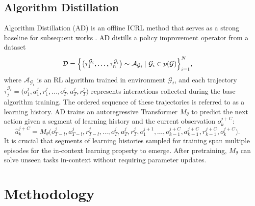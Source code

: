 \documentclass{article}
\begin{document}
\subsection{Algorithm Distillation}
Algorithm Distillation (AD) \citep{laskin2022context} is an offline ICRL method that serves as a strong baseline for subsequent works \citep{lee2024supervised, elawady2024relic}. AD distills a policy improvement operator from a dataset
\[
\mathcal{D} = \Bigl\{ \bigl( \tau_1^{\mathcal{G}_i}, \dots, \tau_n^{\mathcal{G}_i} \bigr) \sim \mathcal{A}_{\mathcal{G}_i} \mid \mathcal{G}_i \in p(\mathcal{G}) \Bigr\}_{i=1}^{N},
\]
where $\mathcal{A}_{\mathcal{G}_i}$ is an RL algorithm trained in environment $\mathcal{G}_i$, and each trajectory $\tau_j^{\mathcal{G}_i} = \bigl( o_1^j, a_1^j, r_1^j, \dots, o_T^j, a_T^j, r_T^j \bigr)$ represents interactions collected during the base algorithm training. The ordered sequence of these trajectories is referred to as a learning history. AD trains an autoregressive Transformer $M_\theta$ to predict the next action given a segment of learning history and the current observation $o_k^{j+C}$:
\[
\hat{a}_k^{j+C} = M_\theta\bigl(o_{T-l}^j, a_{T-l}^j, r_{T-l}^j, \dots, o_T^j, a_T^j, r_T^j, o_1^{j+1}, \dots, o_{k-1}^{j+C}, a_{k-1}^{j+C}, r_{k-1}^{j+C}, o_k^{j+C}\bigr).
\]
It is crucial that segments of learning histories sampled for training span multiple episodes for the in-context learning property to emerge. After pretraining, $M_\theta$ can solve unseen tasks in-context without requiring parameter updates.
\section{Methodology}
\end{document}

